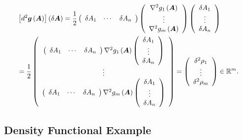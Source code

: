 \documentclass[aps,preprint]{revtex4}%
\begin{document}
\begin{align}
&  \left[  d^{2}\boldsymbol{g}\left(  \boldsymbol{A}\right)  \right]  \left(
\delta\boldsymbol{A}\right)  =\frac{1}{2}\left(
\begin{array}
[c]{ccc}%
\delta A_{1} & \cdots & \delta A_{n}%
\end{array}
\right)  \left(
\begin{array}
[c]{c}%
\nabla^{2}g_{1}\left(  \boldsymbol{A}\right) \\
\vdots\\
\nabla^{2}g_{m}\left(  \boldsymbol{A}\right)
\end{array}
\right)  \left(
\begin{array}
[c]{c}%
\delta A_{1}\\
\vdots\\
\delta A_{n}%
\end{array}
\right) \nonumber\\
&  =\frac{1}{2}\left(
\begin{array}
[c]{c}%
\left(
\begin{array}
[c]{ccc}%
\delta A_{1} & \cdots & \delta A_{n}%
\end{array}
\right)  \nabla^{2}g_{1}\left(  \boldsymbol{A}\right)  \left(
\begin{array}
[c]{c}%
\delta A_{1}\\
\vdots\\
\delta A_{n}%
\end{array}
\right) \\
\vdots\\
\left(
\begin{array}
[c]{ccc}%
\delta A_{1} & \cdots & \delta A_{n}%
\end{array}
\right)  \nabla^{2}g_{m}\left(  \boldsymbol{A}\right)  \left(
\begin{array}
[c]{c}%
\delta A_{1}\\
\vdots\\
\delta A_{n}%
\end{array}
\right)
\end{array}
\right)  =\left(
\begin{array}
[c]{c}%
\delta^{2}\rho_{1}\\
\vdots\\
\delta^{2}\rho_{m}%
\end{array}
\right)  \in\mathbb{R}^{m}.
\end{align}


\subsection{Density Functional Example}
\end{document}
